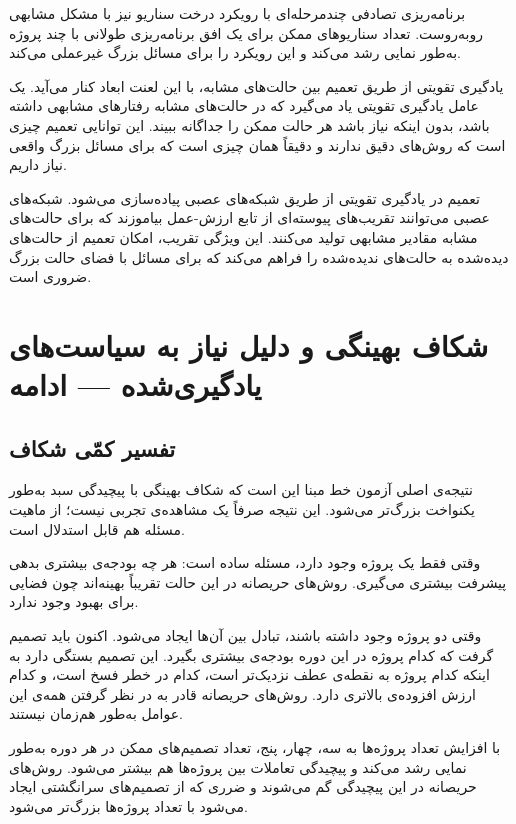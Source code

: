 برنامه‌ریزی تصادفی چندمرحله‌ای با رویکرد درخت سناریو نیز با
مشکل مشابهی روبه‌روست. تعداد سناریوهای ممکن برای یک افق برنامه‌ریزی
طولانی با چند پروژه به‌طور نمایی رشد می‌کند و این رویکرد را برای
مسائل بزرگ غیرعملی می‌کند.

یادگیری تقویتی از طریق تعمیم بین حالت‌های مشابه، با این لعنت
ابعاد کنار می‌آید. یک عامل یادگیری تقویتی یاد می‌گیرد که در
حالت‌های مشابه رفتارهای مشابهی داشته باشد، بدون اینکه نیاز باشد
هر حالت ممکن را جداگانه ببیند. این توانایی تعمیم چیزی است که
روش‌های دقیق ندارند و دقیقاً همان چیزی است که برای مسائل بزرگ
واقعی نیاز داریم.

تعمیم در یادگیری تقویتی از طریق شبکه‌های عصبی پیاده‌سازی می‌شود.
شبکه‌های عصبی می‌توانند تقریب‌های پیوسته‌ای از تابع ارزش-عمل
بیاموزند که برای حالت‌های مشابه مقادیر مشابهی تولید می‌کنند.
این ویژگی تقریب، امکان تعمیم از حالت‌های دیده‌شده به حالت‌های
ندیده‌شده را فراهم می‌کند که برای مسائل با فضای حالت بزرگ
ضروری است.

\section{شکاف بهینگی و دلیل نیاز به سیاست‌های یادگیری‌شده --- ادامه}
\label{sec:gap_continued}

\subsection{تفسیر کمّی شکاف}
\label{subsec:gap_interpretation}

نتیجه‌ی اصلی آزمون خط مبنا این است که شکاف بهینگی با پیچیدگی سبد
به‌طور یکنواخت بزرگ‌تر می‌شود. این نتیجه صرفاً یک مشاهده‌ی
تجربی نیست؛ از ماهیت مسئله هم قابل استدلال است.

وقتی فقط یک پروژه وجود دارد، مسئله ساده است: هر چه بودجه‌ی بیشتری
بدهی پیشرفت بیشتری می‌گیری. روش‌های حریصانه در این حالت تقریباً
بهینه‌اند چون فضایی برای بهبود وجود ندارد.

وقتی دو پروژه وجود داشته باشند، تبادل بین آن‌ها ایجاد می‌شود. اکنون
باید تصمیم گرفت که کدام پروژه در این دوره بودجه‌ی بیشتری بگیرد. این
تصمیم بستگی دارد به اینکه کدام پروژه به نقطه‌ی عطف نزدیک‌تر است،
کدام در خطر فسخ است، و کدام ارزش افزوده‌ی بالاتری دارد. روش‌های
حریصانه قادر به در نظر گرفتن همه‌ی این عوامل به‌طور هم‌زمان نیستند.

با افزایش تعداد پروژه‌ها به سه، چهار، پنج، تعداد تصمیم‌های ممکن
در هر دوره به‌طور نمایی رشد می‌کند و پیچیدگی تعاملات بین پروژه‌ها
هم بیشتر می‌شود. روش‌های حریصانه در این پیچیدگی گم می‌شوند و
ضرری که از تصمیم‌های سرانگشتی ایجاد می‌شود با تعداد پروژه‌ها
بزرگ‌تر می‌شود.

